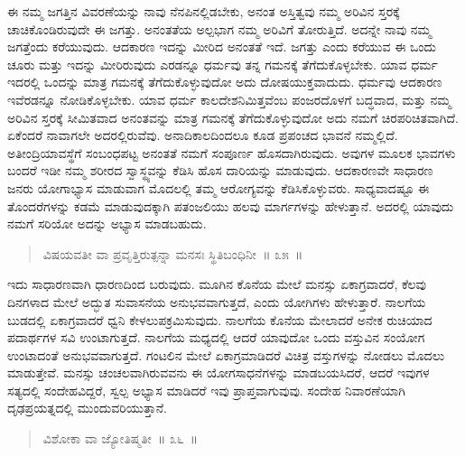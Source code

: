 ಈ ನಮ್ಮ ಜಗತ್ತಿನ ವಿವರಣೆಯನ್ನು ನಾವು ನೆನಪಿನಲ್ಲಿಡಬೇಕು, ಅನಂತ ಅಸ್ತಿತ್ವವು ನಮ್ಮ ಅರಿವಿನ ಸ್ತರಕ್ಕೆ ಚಾಚಿಕೊಂಡಿರುವುದೇ ಈ ಜಗತ್ತು. ಅನಂತತೆಯ ಅಲ್ಪಭಾಗ ನಮ್ಮ ಅರಿವಿಗೆ ತೋರುತ್ತಿದೆ. ಅದನ್ನೇ ನಾವು ನಮ್ಮ ಜಗತ್ತೆಂದು ಕರೆಯುವುದು. ಆದಕಾರಣ ಇದನ್ನು ಮೀರಿದ ಅನಂತತೆ ಇದೆ. ಜಗತ್ತು ಎಂದು ಕರೆಯುವ ಈ ಒಂದು ಚೂರು ಮತ್ತು ಇದನ್ನು ಮೀರಿರುವುದು ಎರಡನ್ನೂ ಧರ್ಮವು ತನ್ನ ಗಮನಕ್ಕೆ ತೆಗೆದುಕೊಳ್ಳಬೇಕು. ಯಾವ ಧರ್ಮ ಇದರಲ್ಲಿ ಒಂದನ್ನು ಮಾತ್ರ ಗಮನಕ್ಕೆ ತೆಗೆದುಕೊಳ್ಳುವುದೋ ಅದು ದೋಷಯುಕ್ತವಾದುದು. ಧರ್ಮವು ಆದಕಾರಣ ಇವೆರಡನ್ನೂ ನೋಡಿಕೊಳ್ಳಬೇಕು. ಯಾವ ಧರ್ಮ ಕಾಲದೇಶನಿಮಿತ್ತವೆಂಬ ಪಂಜರದೊಳಗೆ ಬದ್ಧವಾದ, ಮತ್ತು ನಮ್ಮ ಅರಿವಿನ ಸ್ತರಕ್ಕೆ ಸೀಮಿತವಾದ ಅನಂತವನ್ನು ಮಾತ್ರ ಗಮನಕ್ಕೆ ತೆಗೆದುಕೊಳ್ಳುವುದೋ ಅದು ನಮಗೆ ಚಿರಪರಿಚಿತವಾಗಿದೆ. ಏಕೆಂದರೆ ನಾವಾಗಲೇ ಅದರಲ್ಲಿರುವೆವು. ಅನಾದಿಕಾಲದಿಂದಲೂ ಕೂಡ ಪ್ರಪಂಚದ ಭಾವನೆ ನಮ್ಮಲ್ಲಿದೆ. ಅತೀಂದ್ರಿಯಾವಸ್ಥೆಗೆ ಸಂಬಂಧಪಟ್ಟ ಅನಂತತೆ ನಮಗೆ ಸಂಪೂರ್ಣ ಹೊಸದಾಗಿರುವುದು. ಅವುಗಳ ಮೂಲಕ ಭಾವಗಳು ಬಂದರೆ ಇಡೀ ನಮ್ಮ ಶರೀರದ ಸ್ವಾಸ್ಥ್ಯವನ್ನು ಕೆಡಿಸಿ ಹೊಸ ದಾರಿಯನ್ನು ಮಾಡುವುದು. ಆದಕಾರಣವೇ ಸಾಧಾರಣ ಜನರು ಯೋಗಾಭ್ಯಾಸ ಮಾಡುವಾಗ ಮೊದಲಲ್ಲಿ ತಮ್ಮ ಆರೋಗ್ಯವನ್ನು ಕೆಡಿಸಿಕೊಳ್ಳುವರು. ಸಾಧ್ಯವಾದಷ್ಟೂ ಈ ತೊಂದರೆಗಳನ್ನು ಕಡಮೆ ಮಾಡುವುದಕ್ಕಾಗಿ ಪತಂಜಲಿಯು ಹಲವು ಮಾರ್ಗಗಳನ್ನು ಹೇಳುತ್ತಾನೆ. ಅದರಲ್ಲಿ ಯಾವುದು ನಮಗೆ ಸರಿಯೋ ಅದನ್ನು ಅಭ್ಯಾಸ ಮಾಡಬಹುದು. 


\begin{verse}
ವಿಷಯವತೀ ವಾ ಪ್ರವೃತ್ತಿರುತ್ಪನ್ನಾ ಮನಸಃ ಸ್ಥಿತಿಬಂಧಿನೀ~॥ ೩೫~॥
\end{verse}

\vspace{-0.4cm}


\vspace{0.2cm}

ಇದು ಸಾಧಾರಣವಾಗಿ ಧಾರಣದಿಂದ ಬರುವುದು. ಮೂಗಿನ ಕೊನೆಯ ಮೇಲೆ ಮನಸ್ಸು ಏಕಾಗ್ರವಾದರೆ, ಕೆಲವು ದಿನಗಳಾದ ಮೇಲೆ ಅದ್ಭುತ ಸುವಾಸನೆಯ ಅನುಭವವಾಗುತ್ತದೆ, ಎಂದು ಯೋಗಿಗಳು ಹೇಳುತ್ತಾರೆ. ನಾಲಗೆಯ ಬುಡದಲ್ಲಿ ಏಕಾಗ್ರವಾದರೆ ಧ್ವನಿ ಕೇಳಲುಪಕ್ರಮಿಸುವುದು. ನಾಲಗೆಯ ಕೊನೆಯ ಮೇಲಾದರೆ ಅನೇಕ ರುಚಿಯಾದ ಪದಾರ್ಥಗಳ ಸವಿ ಉಂಟಾಗುತ್ತದೆ. ನಾಲಗೆಯ ಮಧ್ಯದಲ್ಲಿ ಆದರೆ ಯಾವುದೋ ಒಂದು ವಸ್ತುವಿನ ಸಂಯೋಗ ಉಂಟಾದಂತೆ ಅನುಭವವಾಗುತ್ತದೆ. ಗಂಟಲಿನ ಮೇಲೆ ಏಕಾಗ್ರಮಾಡಿದರೆ ವಿಚಿತ್ರ ವಸ್ತುಗಳನ್ನು ನೋಡಲು ಮೊದಲು ಮಾಡುತ್ತೇವೆ. ಮನಸ್ಸು ಚಂಚಲವಾಗಿರುವವನು ಈ ಯೋಗಸಾಧನೆಗಳನ್ನು ಮಾಡಬಯಸಿದರೆ, ಆದರೆ ಇವುಗಳ ಸತ್ಯದಲ್ಲಿ ಸಂದೇಹವಿದ್ದರೆ, ಸ್ವಲ್ಪ ಅಭ್ಯಾಸ ಮಾಡಿದರೆ ಇವು ಪ್ರಾಪ್ತವಾಗುವುವು. ಸಂದೇಹ ನಿವಾರಣೆಯಾಗಿ ದೃಢಪ್ರಯತ್ನದಲ್ಲಿ ಮುಂದುವರಿಯುತ್ತಾನೆ. 

\vspace{-0.15cm}

\begin{verse}
ವಿಶೋಕಾ ವಾ ಜ್ಯೋತಿಷ್ಮತೀ~॥ ೩೬~॥
\end{verse}

\vspace{-0.4cm}

